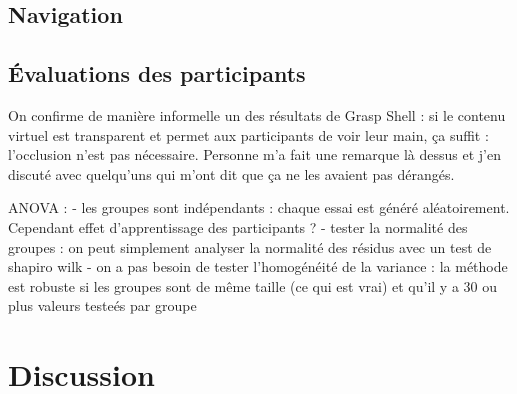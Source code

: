 




\subsection{Navigation}




\subsection{Évaluations des participants}




On confirme de manière informelle un des résultats de Grasp Shell : si le contenu virtuel est transparent et permet aux participants de voir leur main, ça suffit : l'occlusion n'est pas nécessaire. Personne m'a fait une remarque là dessus et j'en discuté avec quelqu'uns qui m'ont dit que ça ne les avaient pas dérangés.

ANOVA :
- les groupes sont indépendants : chaque essai est généré aléatoirement. Cependant effet d'apprentissage des participants ?
- tester la normalité des groupes : on peut simplement analyser la normalité des résidus avec un test de shapiro wilk
- on a pas besoin de tester l'homogénéité de la variance : la méthode est robuste si les groupes sont de même taille (ce qui est vrai) et qu'il y a 30 ou plus valeurs testeés par groupe

\section{Discussion}
